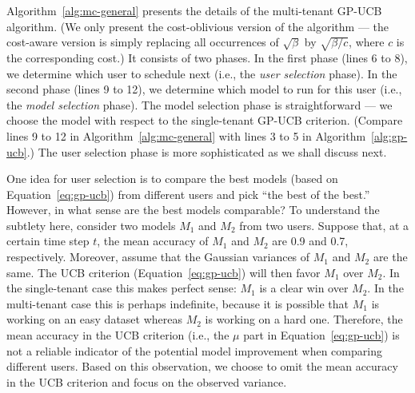 \documentclass[letterpaper]{vldb}
\begin{document}
Algorithm~\ref{alg:mc-general} presents the details of the multi-tenant GP-UCB algorithm.
(We only present the cost-oblivious version of the algorithm --- the cost-aware version is simply replacing all occurrences of $\sqrt{\beta}$ by $\sqrt{\beta/c}$, where $c$ is the corresponding cost.)
It consists of two phases.
In the first phase (lines 6 to 8), we determine which user to schedule next (i.e., the \emph{user selection} phase).
In the second phase (lines 9 to 12), we determine which model to run for this user (i.e., the \emph{model selection} phase).
The model selection phase is straightforward --- we choose the model with respect to the single-tenant GP-UCB criterion. (Compare lines 9 to 12 in Algorithm~\ref{alg:mc-general} with lines 3 to 5 in Algorithm~\ref{alg:gp-ucb}.)
The user selection phase is more sophisticated as we shall discuss next.



One idea for user selection is to compare the best models (based on Equation~\ref{eq:gp-ucb}) from different users and pick ``the best of the best.''
However, in what sense are the best models comparable?
To understand the subtlety here, consider two models $M_1$ and $M_2$ from two users.
Suppose that, at a certain time step $t$, the mean accuracy of $M_1$ and $M_2$ are 0.9 and 0.7, respectively.
Moreover, assume that the Gaussian variances of $M_1$ and $M_2$ are the same.
The UCB criterion (Equation~\ref{eq:gp-ucb}) will then favor $M_1$ over $M_2$.
In the single-tenant case this makes perfect sense: $M_1$ is a clear win over $M_2$.
In the multi-tenant case this is perhaps indefinite, because it is possible that $M_1$ is working on an easy dataset whereas $M_2$ is working on a hard one.
Therefore, the mean accuracy in the UCB criterion (i.e., the $\mu$ part in Equation~\ref{eq:gp-ucb}) is not a reliable indicator of the potential model improvement when comparing different users.
Based on this observation, we choose to omit the mean accuracy in the UCB criterion and focus on the observed variance.
\end{document}
